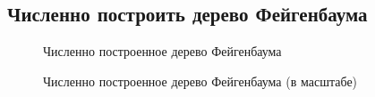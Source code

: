 \documentclass[12pt, a4paper]{article}
\begin{document}
\subsection{Численно построить дерево Фейгенбаума}
\begin{figure}[H]
	\caption{Численно построенное дерево Фейгенбаума}
\end{figure}
\begin{figure}[H]
	\caption{Численно построенное дерево Фейгенбаума (в масштабе)}
\end{figure}
\end{document}
